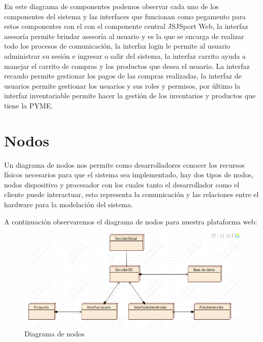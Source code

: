 En este diagrama de componentes podemos observar cada uno de los componentes del sistema y las interfaces que funcionan como pegamento para estos componentes con el con el componente  central JSJSport Web, la interfaz asesoría permite brindar asesoría al usuario y es la que se encarga de realizar todo los procesos de comunicación, la interfaz login le permite al usuario administrar su sesión e ingresar o salir del sistema, la interfaz carrito ayuda a manejar el carrito de compras y los productos que desea el usuario. La interfaz recaudo permite gestionar los pagos de las compras realizadas, la interfaz de usuarios permite gestionar los usuarios y sus roles y permisos, por último la interfaz inventariable permite hacer la gestión de los inventarios y productos que tiene la PYME.

\newpage

\section{Nodos}
Un diagrama de nodos nos permite como desarrolladores conocer los recursos físicos necesarios para que el sistema sea implementado, hay dos tipos de nodos, nodos dispositivo y procesador con los cuales tanto el desarrollador como el cliente puede interactuar, esto representa la comunicación y las relaciones entre el hardware para la modelación del sistema.

A continuación observaremos el diagrama de nodos para nuestra plataforma web:

\begin{figure}[h]
	\centering
	\includegraphics[width=0.7\linewidth]{arquitectura/imagenes/DiagramaNodos}
	\caption{Diagrama de nodos}
	\label{fig:diagramanodos}
\end{figure}

